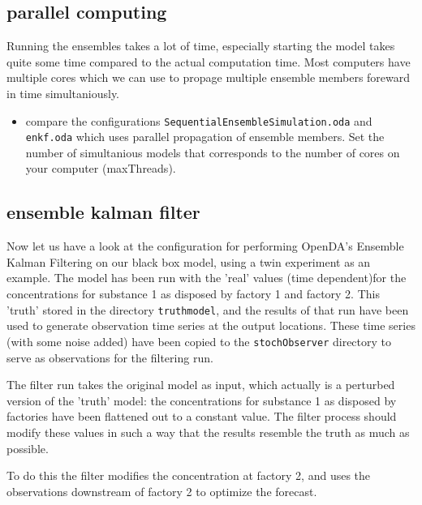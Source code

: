 \subsection{parallel computing}
Running the ensembles takes a lot of time, especially starting the model takes quite some time compared to the actual computation time. Most computers have multiple cores which we can use to propage multiple ensemble members foreward in time simultaniously.
\begin{itemize}
	\item compare the configurations {\tt SequentialEnsembleSimulation.oda} and\\
		{\tt enkf.oda} which uses parallel propagation of ensemble members. Set the number of simultanious models that corresponds to the number of cores on your computer (maxThreads).
\end{itemize}

\subsection{ensemble kalman filter}


Now let us have a look at the configuration for performing OpenDA's Ensemble
Kalman Filtering on our black box model, using a twin experiment as an example.
The model has been run with the 'real' values (time dependent)for the
concentrations for substance 1 as disposed by factory 1 and factory 2. This
'truth' stored in the directory {\tt truthmodel}, and the results of that run
have been used to generate observation time series at the output locations.
These time series (with some noise added) have been copied to the {\tt stochObserver} directory to
serve as observations for the filtering run.

The filter run takes the original model as input, which actually is a perturbed
version of the 'truth' model: the concentrations for substance 1 as disposed by
factories have been flattened out to a constant value. The filter process
should modify these values in such a way that the results resemble the truth as
much as possible.

To do this the filter modifies the concentration at factory 2, and uses the
observations downstream of factory 2 to optimize the forecast.

